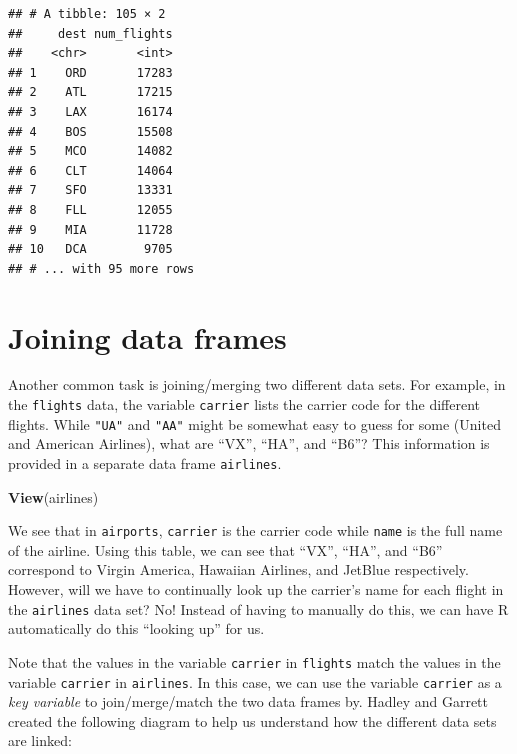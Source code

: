 \documentclass[]{tufte-book}
\newenvironment{Shaded}{\begin{snugshade}}{\end{snugshade}}
\newcommand{\KeywordTok}[1]{\textcolor[rgb]{0.13,0.29,0.53}{\textbf{{#1}}}}
\newcommand{\NormalTok}[1]{{#1}}
\theoremstyle{definition}
\theoremstyle{definition}
\theoremstyle{remark}
\begin{document}
\begin{verbatim}
## # A tibble: 105 × 2
##     dest num_flights
##    <chr>       <int>
## 1    ORD       17283
## 2    ATL       17215
## 3    LAX       16174
## 4    BOS       15508
## 5    MCO       14082
## 6    CLT       14064
## 7    SFO       13331
## 8    FLL       12055
## 9    MIA       11728
## 10   DCA        9705
## # ... with 95 more rows
\end{verbatim}

\section{Joining data frames}\label{joining-data-frames}

Another common task is joining/merging two different data sets. For
example, in the \texttt{flights} data, the variable \texttt{carrier}
lists the carrier code for the different flights. While \texttt{"UA"}
and \texttt{"AA"} might be somewhat easy to guess for some (United and
American Airlines), what are ``VX'', ``HA'', and ``B6''? This
information is provided in a separate data frame \texttt{airlines}.

\begin{Shaded}
\begin{Highlighting}[]
\KeywordTok{View}\NormalTok{(airlines)}
\end{Highlighting}
\end{Shaded}

We see that in \texttt{airports}, \texttt{carrier} is the carrier code
while \texttt{name} is the full name of the airline. Using this table,
we can see that ``VX'', ``HA'', and ``B6'' correspond to Virgin America,
Hawaiian Airlines, and JetBlue respectively. However, will we have to
continually look up the carrier's name for each flight in the
\texttt{airlines} data set? No! Instead of having to manually do this,
we can have R automatically do this ``looking up'' for us.

Note that the values in the variable \texttt{carrier} in
\texttt{flights} match the values in the variable \texttt{carrier} in
\texttt{airlines}. In this case, we can use the variable
\texttt{carrier} as a \emph{key variable} to join/merge/match the two
data frames by. Hadley and Garrett \citep{rds2016} created the following
diagram to help us understand how the different data sets are linked:
\end{document}
